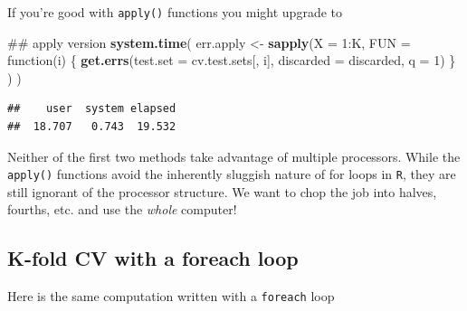 \documentclass[]{article}
\newenvironment{Shaded}{\begin{snugshade}}{\end{snugshade}}
\newcommand{\KeywordTok}[1]{\textcolor[rgb]{0.13,0.29,0.53}{\textbf{{#1}}}}
\newcommand{\DataTypeTok}[1]{\textcolor[rgb]{0.13,0.29,0.53}{{#1}}}
\newcommand{\DecValTok}[1]{\textcolor[rgb]{0.00,0.00,0.81}{{#1}}}
\newcommand{\StringTok}[1]{\textcolor[rgb]{0.31,0.60,0.02}{{#1}}}
\newcommand{\OtherTok}[1]{\textcolor[rgb]{0.56,0.35,0.01}{{#1}}}
\newcommand{\NormalTok}[1]{{#1}}
\begin{document}
If you're good with \texttt{apply()} functions you might upgrade to

\begin{Shaded}
\begin{Highlighting}[]
\NormalTok{## apply version}
\KeywordTok{system.time}\NormalTok{(}
    \NormalTok{err.apply <-}\StringTok{ }\KeywordTok{sapply}\NormalTok{(}\DataTypeTok{X =} \DecValTok{1}\NormalTok{:K, }
                        \DataTypeTok{FUN =} \NormalTok{function(i) \{}
                            \KeywordTok{get.errs}\NormalTok{(}\DataTypeTok{test.set =} \NormalTok{cv.test.sets[, i],}
                                     \DataTypeTok{discarded =} \NormalTok{discarded,}
                                     \DataTypeTok{q =} \DecValTok{1}\NormalTok{)}
                            \NormalTok{\}}
                        \NormalTok{)}
    \NormalTok{)}
\end{Highlighting}
\end{Shaded}

\begin{verbatim}
##    user  system elapsed 
##  18.707   0.743  19.532
\end{verbatim}

Neither of the first two methods take advantage of multiple processors.
While the \texttt{apply()} functions avoid the inherently sluggish
nature of for loops in \texttt{R}, they are still ignorant of the
processor structure. We want to chop the job into halves, fourths, etc.
and use the \emph{whole} computer!

\subsection{K-fold CV with a foreach
loop}\label{k-fold-cv-with-a-foreach-loop}

Here is the same computation written with a \texttt{foreach} loop

\begin{Shaded}
\end{Shaded}
\end{document}
